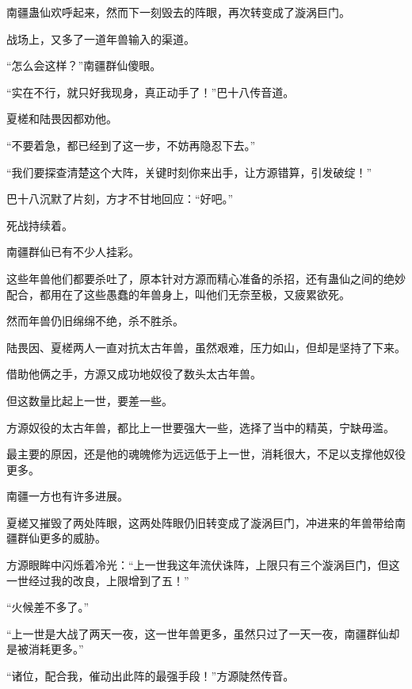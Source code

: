 \begin{this_body}
南疆蛊仙欢呼起来，然而下一刻毁去的阵眼，再次转变成了漩涡巨门。

战场上，又多了一道年兽输入的渠道。

“怎么会这样？”南疆群仙傻眼。

“实在不行，就只好我现身，真正动手了！”巴十八传音道。

夏槎和陆畏因都劝他。

“不要着急，都已经到了这一步，不妨再隐忍下去。”

“我们要探查清楚这个大阵，关键时刻你来出手，让方源错算，引发破绽！”

巴十八沉默了片刻，方才不甘地回应：“好吧。”

死战持续着。

南疆群仙已有不少人挂彩。

这些年兽他们都要杀吐了，原本针对方源而精心准备的杀招，还有蛊仙之间的绝妙配合，都用在了这些愚蠢的年兽身上，叫他们无奈至极，又疲累欲死。

然而年兽仍旧绵绵不绝，杀不胜杀。

陆畏因、夏槎两人一直对抗太古年兽，虽然艰难，压力如山，但却是坚持了下来。

借助他俩之手，方源又成功地奴役了数头太古年兽。

但这数量比起上一世，要差一些。

方源奴役的太古年兽，都比上一世要强大一些，选择了当中的精英，宁缺毋滥。

最主要的原因，还是他的魂魄修为远远低于上一世，消耗很大，不足以支撑他奴役更多。

南疆一方也有许多进展。

夏槎又摧毁了两处阵眼，这两处阵眼仍旧转变成了漩涡巨门，冲进来的年兽带给南疆群仙更多的威胁。

方源眼眸中闪烁着冷光：“上一世我这年流伏诛阵，上限只有三个漩涡巨门，但这一世经过我的改良，上限增到了五！”

“火候差不多了。”

“上一世是大战了两天一夜，这一世年兽更多，虽然只过了一天一夜，南疆群仙却是被消耗更多。”

“诸位，配合我，催动出此阵的最强手段！”方源陡然传音。

\end{this_body}

